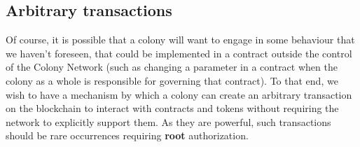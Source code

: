 \subsection{Arbitrary transactions}\label{sec:arbitrary-transaction}

Of course, it is possible that a colony will want to engage in some behaviour that we haven't foreseen, that could be implemented in a contract outside the control of the Colony Network (such as changing a parameter in a contract when the colony as a whole is responsible for governing that contract). To that end, we wish to have a mechanism by which a colony can create an arbitrary transaction on the blockchain to interact with contracts and tokens without requiring the network to explicitly support them. As they are powerful, such transactions should be rare occurrences requiring \textbf{root} authorization.
